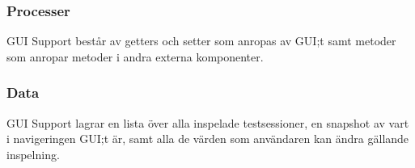 \subsubsection{Processer}
GUI Support består av getters och setter som anropas av GUI;t samt metoder som anropar metoder i andra externa komponenter.

\subsubsection{Data}
GUI Support lagrar en lista över alla inspelade testsessioner, en snapshot av vart i navigeringen GUI;t är, samt alla de värden som användaren kan ändra gällande inspelning.

